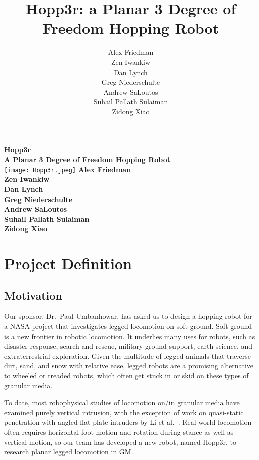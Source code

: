 \documentclass{report}
\title{Hopp3r: a Planar 3 Degree of Freedom Hopping Robot}
\author{
Alex Friedman\\
Zen Iwankiw\\
Dan Lynch\\
Greg Niederschulte\\
Andrew SaLoutos\\
Suhail Pallath Sulaiman\\
Zidong Xiao\\
}
\begin{document}

\begin{titlepage}
    \centering
    \vfill
    {\bfseries\Large
        Hopp3r\\
        \vskip2cm
        A Planar 3 Degree of Freedom Hopping Robot\\
    }    
    \vfill
    \texttt{[image: Hopp3r.jpeg]} %
    \vfill
    {\bfseries\Large
        Alex Friedman\\
        Zen Iwankiw\\
        Dan Lynch\\
        Greg Niederschulte\\
        Andrew SaLoutos\\
        Suhail Pallath Sulaiman\\
        Zidong Xiao\\
    }
    \vfill
\end{titlepage}

\tableofcontents

\chapter[Project Definition]{Project Definition}
\section[Motivation]{Motivation}
Our sponsor, Dr.\ Paul Umbanhowar, has asked us to design a hopping robot for a NASA project that investigates legged locomotion on soft ground. Soft ground is a new frontier in robotic locomotion. It underlies many uses for robots, such as disaster response, search and rescue, military ground support, earth science, and extraterrestrial exploration. Given the multitude of legged animals that traverse dirt, sand, and snow with relative ease, legged robots are a promising alternative to wheeled or treaded robots, which often get stuck in or skid on these types of granular media.

To date, most robophysical studies of locomotion on/in granular media have examined purely vertical intrusion, with the exception of work on quasi-static penetration with angled flat plate intruders by Li et al.\ \cite{Li}. Real-world locomotion often requires horizontal foot motion and rotation during stance as well as vertical motion, so our team has developed a new robot, named Hopp3r, to research planar legged locomotion in GM.
\end{document}
